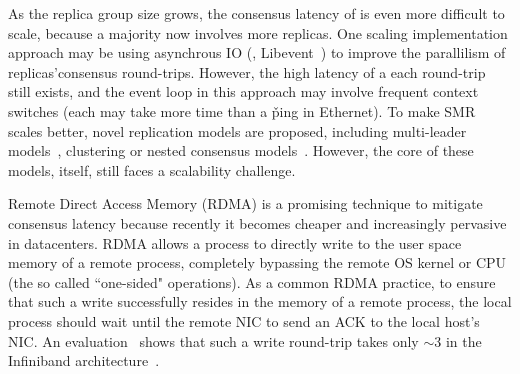 As the replica group size grows, the consensus latency of \paxos is even more 
difficult to scale, because a majority now involves more replicas. One 
scaling implementation approach may be using asynchrous IO (\eg, 
Libevent~\cite{libevent}) to improve the parallilism of replicas'consensus 
round-trips. However, the high latency of a each round-trip still exists, and 
the event loop in this approach may involve frequent context switches (each may 
take more time than a \v{ping} in Ethernet). To make SMR scales better, novel 
replication models are proposed, including 
multi-leader models~\cite{epaxos:sosp13,mencius:osdi08}, clustering or nested 
consensus models~\cite{scatter:sosp11,manos:hotdep10}. However, the core of 
these models, \paxos itself, still faces a scalability challenge.




Remote Direct Access Memory (RDMA) is a promising technique to mitigate 
consensus latency because recently it becomes cheaper and increasingly 
pervasive in datacenters. RDMA allows a process to directly write to the 
user space memory of a remote process, completely bypassing the remote OS 
kernel or CPU (the so called ``one-sided" operations). As a common 
RDMA practice, to ensure that such a write successfully resides in the 
memory of a remote process, the local process should wait until the remote NIC 
to send an ACK to the local host's NIC. An evaluation~\cite{pilaf:usenix14} 
shows that such a write round-trip takes only $\sim$3 \us in the Infiniband 
architecture~\cite{infiniband}.

